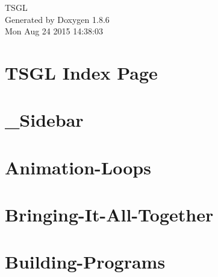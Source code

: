\documentclass[twoside]{book}
\newcommand{\clearemptydoublepage}{%
  \newpage{\pagestyle{empty}\cleardoublepage}%
}
\begin{document}
\hypersetup{pageanchor=false}
\begin{titlepage}
\vspace*{7cm}
\begin{center}%
{\Large T\-S\-G\-L }\\
\vspace*{1cm}
{\large Generated by Doxygen 1.8.6}\\
\vspace*{0.5cm}
{\small Mon Aug 24 2015 14:38:03}\\
\end{center}
\end{titlepage}
\clearemptydoublepage
\tableofcontents
\clearemptydoublepage
{}
\hypersetup{pageanchor=true}

\chapter{T\-S\-G\-L Index Page}
\label{index}\hypertarget{index}{}
\chapter{\-\_\-\-Sidebar}
\label{md__home_cpd5_workspace__t_s_g_l_docs-wiki___sidebar}
\hypertarget{md__home_cpd5_workspace__t_s_g_l_docs-wiki___sidebar}{}

\chapter{Animation-\/\-Loops}
\label{md__home_cpd5_workspace__t_s_g_l_docs-wiki__animation-_loops}
\hypertarget{md__home_cpd5_workspace__t_s_g_l_docs-wiki__animation-_loops}{}

\chapter{Bringing-\/\-It-\/\-All-\/\-Together}
\label{md__home_cpd5_workspace__t_s_g_l_docs-wiki__bringing-_it-_all-_together}
\hypertarget{md__home_cpd5_workspace__t_s_g_l_docs-wiki__bringing-_it-_all-_together}{}

\chapter{Building-\/\-Programs}
\label{md__home_cpd5_workspace__t_s_g_l_docs-wiki__building-_programs}
\hypertarget{md__home_cpd5_workspace__t_s_g_l_docs-wiki__building-_programs}{}

\end{document}

